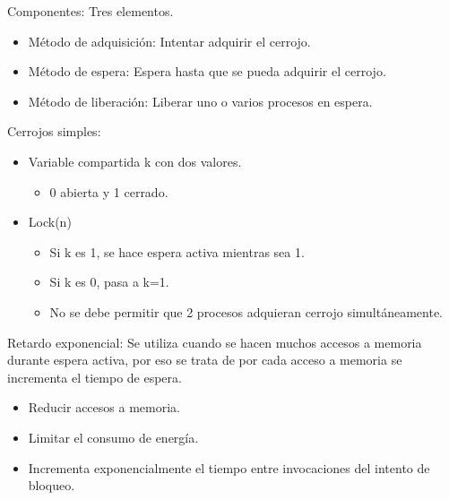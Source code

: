 \documentclass[12pt, twoside, openright]{report} %
\begin{document}
    Componentes: Tres elementos.

    \begin{itemize}
    
    \item
      Método de adquisición: Intentar adquirir el cerrojo.
    \item
      Método de espera: Espera hasta que se pueda adquirir el cerrojo.
    \item
      Método de liberación: Liberar uno o varios procesos en espera.
    \end{itemize}
\pagebreak
    Cerrojos simples:

    \begin{itemize}
    
    \item
      Variable compartida k con dos valores.

      \begin{itemize}
      
      \item
        0 abierta y 1 cerrado.
      \end{itemize}
    \item
      Lock(n)

      \begin{itemize}
      
      \item
        Si k es 1, se hace espera activa mientras sea 1.
      \item
        Si k es 0, pasa a k=1.
      \item
        No se debe permitir que 2 procesos adquieran cerrojo
        simultáneamente.
      \end{itemize}
    \end{itemize}

    Retardo exponencial: Se utiliza cuando se hacen muchos accesos a
    memoria durante espera activa, por eso se trata de por cada acceso
    a memoria se incrementa el tiempo de espera.

    \begin{itemize}
    
    \item
      Reducir accesos a memoria.
    \item
      Limitar el consumo de energía.
    \item
      Incrementa exponencialmente el tiempo entre invocaciones del
      intento de bloqueo.
    \end{itemize}
\end{document}
